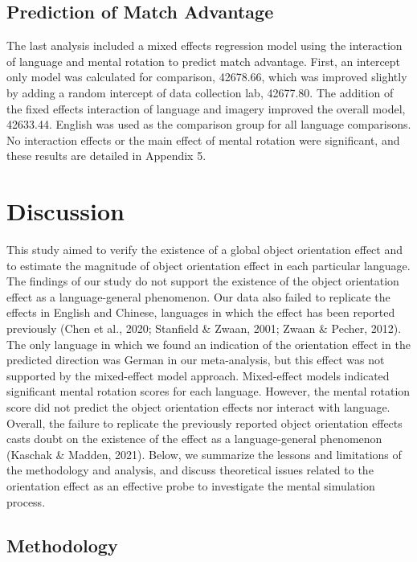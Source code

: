 \documentclass[
  man,floatsintext]{apa7}
\begin{document}
\hypertarget{prediction-of-match-advantage}{%
\subsection{Prediction of Match Advantage}\label{prediction-of-match-advantage}}

The last analysis included a mixed effects regression model using the
interaction of language and mental rotation to predict match advantage.
First, an intercept only model was calculated for comparison,
42678.66, which
was improved slightly by adding a random intercept of data collection
lab, 42677.80. The
addition of the fixed effects interaction of language and imagery
improved the overall model,
42633.44. English
was used as the comparison group for all language comparisons. No
interaction effects or the main effect of mental rotation were
significant, and these results are detailed in Appendix 5.

\hypertarget{discussion}{%
\section{Discussion}\label{discussion}}

This study aimed to verify the existence of a global object orientation
effect and to estimate the magnitude of object orientation effect in
each particular language. The findings of our study do not support the
existence of the object orientation effect as a language-general
phenomenon. Our data also failed to replicate the effects in English and
Chinese, languages in which the effect has been reported previously
(Chen et al., 2020; Stanfield \& Zwaan, 2001; Zwaan \& Pecher, 2012). The only language in which we
found an indication of the orientation effect in the predicted direction
was German in our meta-analysis, but this effect was not supported by
the mixed-effect model approach. Mixed-effect models indicated
significant mental rotation scores for each language. However, the
mental rotation score did not predict the object orientation effects nor
interact with language. Overall, the failure to replicate the previously
reported object orientation effects casts doubt on the existence of the
effect as a language-general phenomenon
(Kaschak \& Madden, 2021). Below, we summarize the lessons and
limitations of the methodology and analysis, and discuss theoretical
issues related to the orientation effect as an effective probe to
investigate the mental simulation process.

\hypertarget{methodology}{%
\subsection{Methodology}\label{methodology}}
\end{document}

